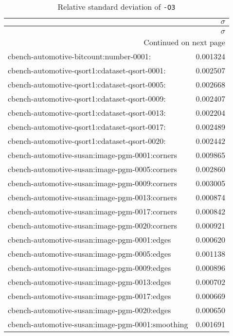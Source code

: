 \begin{longtable}{lr}
\caption{Relative standard deviation of \texttt{-O3}} \label{table:default-relative-standard-deviation} \\
\toprule
 & $\sigma$ \\
\midrule
\endfirsthead
\caption[]{Relative standard deviation of \texttt{-O3}} \\
\toprule
 & $\sigma$ \\
\midrule
\endhead
\midrule
\multicolumn{2}{r}{Continued on next page} \\
\midrule
\endfoot
\bottomrule
\endlastfoot
cbench-automotive-bitcount:number-0001: & 0.001324 \\
cbench-automotive-qsort1:cdataset-qsort-0001: & 0.002507 \\
cbench-automotive-qsort1:cdataset-qsort-0005: & 0.002668 \\
cbench-automotive-qsort1:cdataset-qsort-0009: & 0.002407 \\
cbench-automotive-qsort1:cdataset-qsort-0013: & 0.002204 \\
cbench-automotive-qsort1:cdataset-qsort-0017: & 0.002489 \\
cbench-automotive-qsort1:cdataset-qsort-0020: & 0.002442 \\
cbench-automotive-susan:image-pgm-0001:corners & 0.009865 \\
cbench-automotive-susan:image-pgm-0005:corners & 0.002860 \\
cbench-automotive-susan:image-pgm-0009:corners & 0.003005 \\
cbench-automotive-susan:image-pgm-0013:corners & 0.000874 \\
cbench-automotive-susan:image-pgm-0017:corners & 0.000842 \\
cbench-automotive-susan:image-pgm-0020:corners & 0.000921 \\
cbench-automotive-susan:image-pgm-0001:edges & 0.000620 \\
cbench-automotive-susan:image-pgm-0005:edges & 0.001138 \\
cbench-automotive-susan:image-pgm-0009:edges & 0.000896 \\
cbench-automotive-susan:image-pgm-0013:edges & 0.000702 \\
cbench-automotive-susan:image-pgm-0017:edges & 0.000669 \\
cbench-automotive-susan:image-pgm-0020:edges & 0.000650 \\
cbench-automotive-susan:image-pgm-0001:smoothing & 0.001691 \\

\end{longtable}
